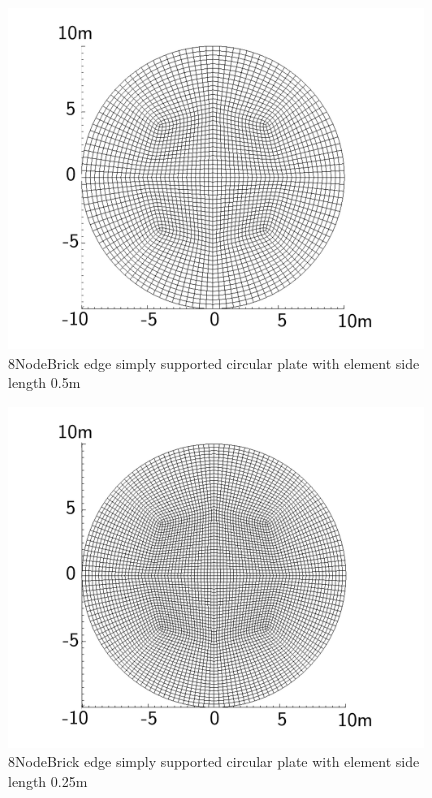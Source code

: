\documentclass[fleqn,11pt]{article}
\begin{document}
\begin{figure}[H]
  \centering
  \includegraphics[width=11cm]{../Figure-files/circular_plate5.pdf}
  \caption{8NodeBrick edge simply supported circular plate with element side length 0.5m }
  \label{fig 8NodeBrick edges simply supported circular plate with element side length 0.5m }
\end{figure}

\newpage

\begin{figure}[H]
  \centering
  \includegraphics[width=11cm]{../Figure-files/circular_plate6.pdf}
  \caption{8NodeBrick edge simply supported circular plate with element side length 0.25m }
  \label{fig 8NodeBrick edges simply supported circular plate with element side length 0.25m }
\end{figure}
\end{document}
